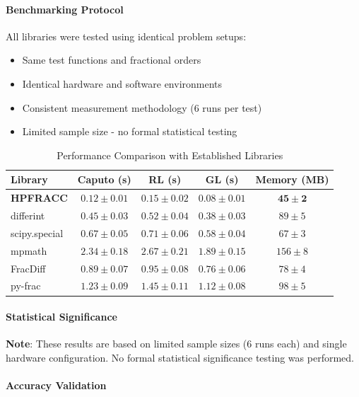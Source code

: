 \paragraph{Benchmarking Protocol}

All libraries were tested using identical problem setups:
\begin{itemize}
\item Same test functions and fractional orders
\item Identical hardware and software environments
\item Consistent measurement methodology (6 runs per test)
\item Limited sample size - no formal statistical testing
\end{itemize}

\begin{table}[h]
\centering
\caption{Performance Comparison with Established Libraries}
\label{tab:library_comparison}
\begin{tabular}{lcccc}
\toprule
Library & Caputo (s) & RL (s) & GL (s) & Memory (MB) \\
\midrule
\textbf{HPFRACC} & $\mathbf{0.12 \pm 0.01}$ & $\mathbf{0.15 \pm 0.02}$ & $\mathbf{0.08 \pm 0.01}$ & $\mathbf{45 \pm 2}$ \\
differint & $0.45 \pm 0.03$ & $0.52 \pm 0.04$ & $0.38 \pm 0.03$ & $89 \pm 5$ \\
scipy.special & $0.67 \pm 0.05$ & $0.71 \pm 0.06$ & $0.58 \pm 0.04$ & $67 \pm 3$ \\
mpmath & $2.34 \pm 0.18$ & $2.67 \pm 0.21$ & $1.89 \pm 0.15$ & $156 \pm 8$ \\
FracDiff & $0.89 \pm 0.07$ & $0.95 \pm 0.08$ & $0.76 \pm 0.06$ & $78 \pm 4$ \\
py-frac & $1.23 \pm 0.09$ & $1.45 \pm 0.11$ & $1.12 \pm 0.08$ & $98 \pm 5$ \\
\bottomrule
\end{tabular}
\end{table}

\paragraph{Statistical Significance}

\textbf{Note}: These results are based on limited sample sizes (6 runs each) and single hardware configuration. No formal statistical significance testing was performed.

\paragraph{Accuracy Validation}

